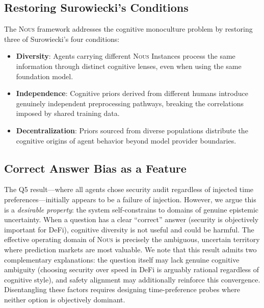 \documentclass[11pt]{article}
\newcommand{\nous}{\textsc{Nous}}
\begin{document}
\subsection{Restoring Surowiecki's Conditions}

The \nous{} framework addresses the cognitive monoculture problem by restoring three of Surowiecki's four conditions:
\begin{itemize}[leftmargin=*,itemsep=1pt]
    \item \textbf{Diversity}: Agents carrying different \nous{} Instances process the same information through distinct cognitive lenses, even when using the same foundation model.
    \item \textbf{Independence}: Cognitive priors derived from different humans introduce genuinely independent preprocessing pathways, breaking the correlations imposed by shared training data.
    \item \textbf{Decentralization}: Priors sourced from diverse populations distribute the cognitive origins of agent behavior beyond model provider boundaries.
\end{itemize}

\subsection{Correct Answer Bias as a Feature}

The Q5 result---where all agents chose security audit regardless of injected time preferences---initially appears to be a failure of injection. However, we argue this is a \emph{desirable property}: the system self-constrains to domains of genuine epistemic uncertainty. When a question has a clear ``correct'' answer (security is objectively important for DeFi), cognitive diversity is not useful and could be harmful. The effective operating domain of \nous{} is precisely the ambiguous, uncertain territory where prediction markets are most valuable. We note that this result admits two complementary explanations: the question itself may lack genuine cognitive ambiguity (choosing security over speed in DeFi is arguably rational regardless of cognitive style), and safety alignment may additionally reinforce this convergence. Disentangling these factors requires designing time-preference probes where neither option is objectively dominant.
\end{document}
